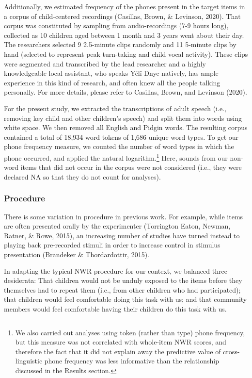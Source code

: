 \documentclass[
  english,
  ,man,floatsintext]{apa6}
\begin{document}
Additionally, we estimated frequency of the phones present in the target items in a corpus of child-centered recordings (Casillas, Brown, \& Levinson, 2020). That corpus was constituted by sampling from audio-recordings (7-9 hours long), collected as 10 children aged between 1 month and 3 years went about their day. The researchers selected 9 2.5-minute clips randomly and 11 5-minute clips by hand (selected to represent peak turn-taking and child vocal activity). These clips were segmented and transcribed by the lead researcher and a highly knowledgeable local assistant, who speaks Yélî Dnye natively, has ample experience in this kind of research, and often knew all the people talking personally. For more details, please refer to Casillas, Brown, and Levinson (2020).

For the present study, we extracted the transcriptions of adult speech (i.e., removing key child and other children's speech) and split them into words using white space. We then removed all English and Pidgin words. The resulting corpus contained a total of 18,934 word tokens of 1,686 unique word types. To get our phone frequency measure, we counted the number of word types in which the phone occurred, and applied the natural logarithm.\footnote{We also carried out analyses using token (rather than type) phone frequency, but this measure was not correlated with whole-item NWR scores, and therefore the fact that it did not explain away the predictive value of cross-linguistic phone frequency was less informative than the relationship discussed in the Results section.} Here, sounds from our non-word items that did not occur in the corpus were not considered (i.e., they were declared NA so that they do not count for analyses).

\hypertarget{procedure}{%
\subsubsection{Procedure}\label{procedure}}

There is some variation in procedure in previous work. For example, while items are often presented orally by the experimenter (Torrington Eaton, Newman, Ratner, \& Rowe, 2015), an increasing number of studies have turned instead to playing back pre-recorded stimuli in order to increase control in stimulus presentation (Brandeker \& Thordardottir, 2015).

In adapting the typical NWR procedure for our context, we balanced three desiderata: That children would not be unduly exposed to the items before they themselves had to repeat them (i.e., from other children who had participated); that children would feel comfortable doing this task with us; and that community members would feel comfortable having their children do this task with us.
\end{document}
